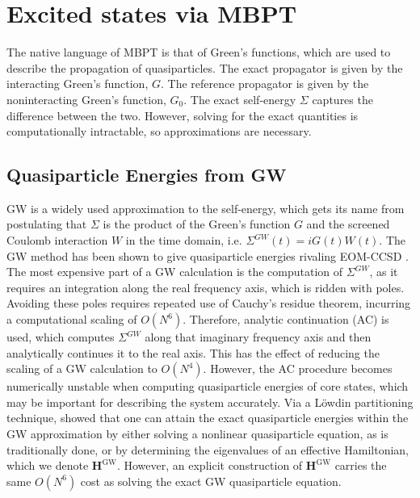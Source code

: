 \documentclass[letterpaper]{article}
\begin{document}
\section{Excited states via MBPT}
The native language of MBPT is that of Green's functions, which are used to describe the propagation of quasiparticles. The exact propagator is given by the interacting Green's function, $G$. The reference propagator is given by the noninteracting Green's function, $G_0$. The exact self-energy $\Sigma$ captures the difference between the two. However, solving for the exact quantities is computationally intractable, so approximations are necessary.

\subsection{Quasiparticle Energies from GW}
GW is a widely used approximation to the self-energy, which gets its name from postulating that $\Sigma$ is the product of the Green's function $G$ and the screened Coulomb interaction $W$ in the time domain, i.e. $\Sigma^{GW}(t) = i G(t) W(t)$. The GW method has been shown to give quasiparticle energies rivaling EOM-CCSD \cite{Bruneval2021-uj}. The most expensive part of a GW calculation is the computation of $\Sigma^{GW}$, as it requires an integration along the real frequency axis, which is ridden with poles. Avoiding these poles requires repeated use of Cauchy's residue theorem, incurring a computational scaling of $O(N^6)$. Therefore, analytic continuation (AC) is used, which computes $\Sigma^{GW}$ along that imaginary frequency axis and then analytically continues it to the real axis. This has the effect of reducing the scaling of a GW calculation to $O(N^4)$. However, the AC procedure becomes numerically unstable when computing quasiparticle energies of core states, which may be important for describing the system accurately\cite{Golze2019-wm}. Via a Löwdin partitioning technique, \citet{Quintero-Monsebaiz2022-en} showed that one can attain the exact quasiparticle energies within the GW approximation by either solving a nonlinear quasiparticle equation, as is traditionally done, or by determining the eigenvalues of an effective Hamiltonian, which we denote $\mathbf{H}^{\mathrm{GW}}$. However, an explicit construction of $\mathbf{H}^{\mathrm{GW}}$ carries the same $O(N^6)$ cost as solving the exact GW quasiparticle equation.
\end{document}

